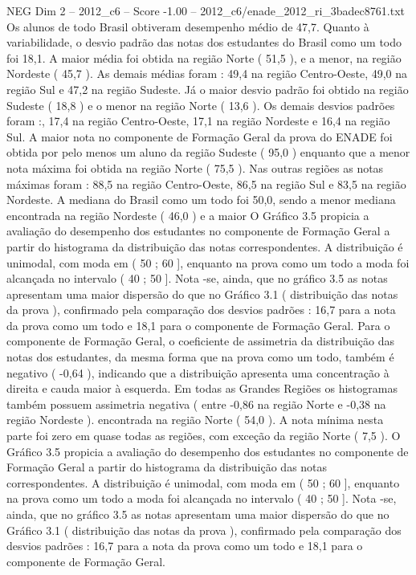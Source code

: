 \begin{textsample}{NEG Dim 2 – 2012\_c6 – Score -1.00 – 2012\_c6/enade\_2012\_ri\_3badec8761.txt}
Os alunos de todo Brasil obtiveram desempenho médio de 47,7.
Quanto à variabilidade, o desvio padrão das notas dos estudantes do Brasil como um todo foi 18,1.
A maior média foi obtida na região Norte ( 51,5 ), e a menor, na região Nordeste ( 45,7 ).
As demais médias foram : 49,4 na região Centro-Oeste, 49,0 na região Sul e 47,2 na região Sudeste.
Já o maior desvio padrão foi obtido na região Sudeste ( 18,8 ) e o menor na região Norte ( 13,6 ).
Os demais desvios padrões foram :, 17,4 na região Centro-Oeste, 17,1 na região Nordeste e 16,4 na região Sul.
A maior nota no componente de Formação Geral da prova do ENADE foi obtida por pelo menos um aluno da região Sudeste ( 95,0 ) enquanto que a menor nota máxima foi obtida na região Norte ( 75,5 ).
Nas outras regiões as notas máximas foram : 88,5 na região Centro-Oeste, 86,5 na região Sul e 83,5 na região Nordeste.
A mediana do Brasil como um todo foi 50,0, sendo a menor mediana encontrada na região Nordeste ( 46,0 ) e a maior O Gráfico 3.5 propicia a avaliação do desempenho dos estudantes no componente de Formação Geral a partir do histograma da distribuição das notas correspondentes.
A distribuição é unimodal, com moda em ( 50 ; 60 ], enquanto na prova como um todo a moda foi alcançada no intervalo ( 40 ; 50 ].
Nota -se, ainda, que no gráfico 3.5 as notas apresentam uma maior dispersão do que no Gráfico 3.1 ( distribuição das notas da prova ), confirmado pela comparação dos desvios padrões : 16,7 para a nota da prova como um todo e 18,1 para o componente de Formação Geral.
Para o componente de Formação Geral, o coeficiente de assimetria da distribuição das notas dos estudantes, da mesma forma que na prova como um todo, também é negativo ( -0,64 ), indicando que a distribuição apresenta uma concentração à direita e cauda maior à esquerda.
Em todas as Grandes Regiões os histogramas também possuem assimetria negativa ( entre -0,86 na região Norte e -0,38 na região Nordeste ). encontrada na região Norte ( 54,0 ).
A nota mínima nesta parte foi zero em quase todas as regiões, com exceção da região Norte ( 7,5 ).
O Gráfico 3.5 propicia a avaliação do desempenho dos estudantes no componente de Formação Geral a partir do histograma da distribuição das notas correspondentes.
A distribuição é unimodal, com moda em ( 50 ; 60 ], enquanto na prova como um todo a moda foi alcançada no intervalo ( 40 ; 50 ].
Nota -se, ainda, que no gráfico 3.5 as notas apresentam uma maior dispersão do que no Gráfico 3.1 ( distribuição das notas da prova ), confirmado pela comparação dos desvios padrões : 16,7 para a nota da prova como um todo e 18,1 para o componente de Formação Geral.

\end{textsample}
